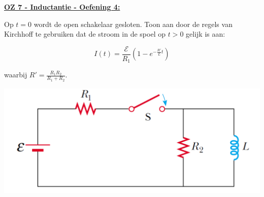 \textbf{\underline{OZ 7 - Inductantie - Oefening 4:}}
\vspace{0.5cm}

Op $t = 0$ wordt de open schakelaar gesloten. Toon aan door de regels van Kirchhoff te gebruiken dat de stroom in de spoel op $t > 0$ gelijk is aan:

\begin{equation*}
    I(t) = \frac{\mathcal{E}}{R_1} \left( 1 - e^{-\tfrac{R'}{L}t} \right)
\end{equation*}

waarbij $R' = \frac{R_1R_2}{R_1 + R_2}$.

\begin{center}
    \includegraphics[scale = 0.3]{oz07/resources/Oz7Oef4.png}
\end{center}

